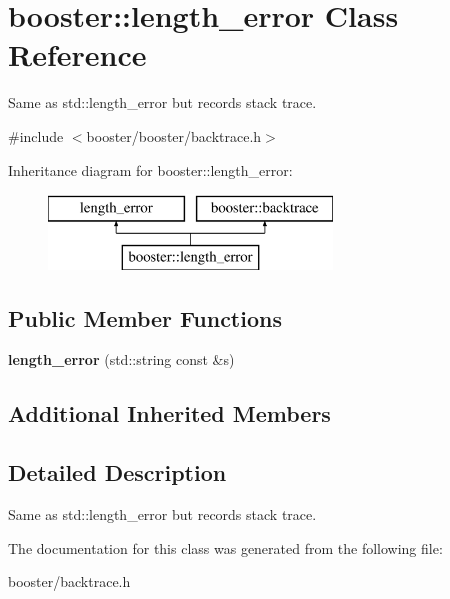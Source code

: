 \section{booster\+:\+:length\+\_\+error Class Reference}
\label{classbooster_1_1length__error}


Same as std\+::length\+\_\+error but records stack trace.  




{\ttfamily \#include $<$booster/booster/backtrace.\+h$>$}

Inheritance diagram for booster\+:\+:length\+\_\+error\+:\begin{figure}[H]
\begin{center}
\leavevmode
\includegraphics[height=2.000000cm]{classbooster_1_1length__error}
\end{center}
\end{figure}
\subsection*{Public Member Functions}
\begin{DoxyCompactItemize}
\item 
{\bfseries length\+\_\+error} (std\+::string const \&s)\label{classbooster_1_1length__error_a38d9c01105d54f14c960a8f6fd04b893}

\end{DoxyCompactItemize}
\subsection*{Additional Inherited Members}


\subsection{Detailed Description}
Same as std\+::length\+\_\+error but records stack trace. 

The documentation for this class was generated from the following file\+:\begin{DoxyCompactItemize}
\item 
booster/backtrace.\+h\end{DoxyCompactItemize}
